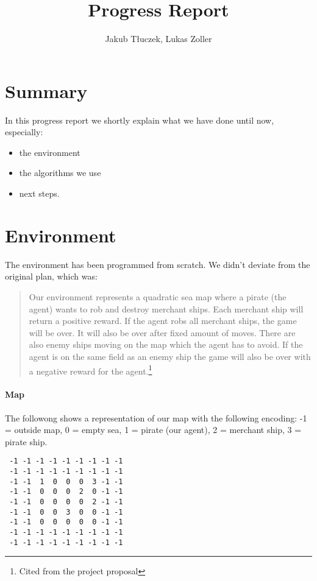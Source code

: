 \documentclass[11pt]{article} %
\title{Progress Report}
\author{Jakub Tłuczek, Lukas Zoller}
\begin{document}
\maketitle

\section{Summary}
In this progress report we shortly explain what we have done until now, especially: 
\begin{itemize}
	\item the environment
	\item the algorithms we use
	\item next steps.
\end{itemize}

\section{Environment}
The environment has been programmed from scratch. We didn't deviate from the original plan, which was:


\begin{quote}
Our environment represents a quadratic sea map where a pirate (the agent) wants to rob and destroy merchant ships. Each merchant ship will return a positive reward. If the agent robs all merchant ships, the game will be over. It will also be over after fixed amount of moves. There are also enemy ships moving on the map which the agent has to avoid. If the agent is on the same field as an enemy ship the game will also be over with a negative reward for the agent.\footnote{Cited from the project proposal}
\end{quote}

\clearpage

\paragraph{Map}
The followong shows a representation of our map with the following encoding: -1 = outside map, 0 = empty sea, 1 = pirate (our agent), 2 = merchant ship, 3 = pirate ship.

\begin{verbatim}
 -1 -1 -1 -1 -1 -1 -1 -1 -1
 -1 -1 -1 -1 -1 -1 -1 -1 -1
 -1 -1  1  0  0  0  3 -1 -1
 -1 -1  0  0  0  2  0 -1 -1
 -1 -1  0  0  0  0  2 -1 -1
 -1 -1  0  0  3  0  0 -1 -1
 -1 -1  0  0  0  0  0 -1 -1
 -1 -1 -1 -1 -1 -1 -1 -1 -1
 -1 -1 -1 -1 -1 -1 -1 -1 -1
\end{verbatim}
\end{document}
